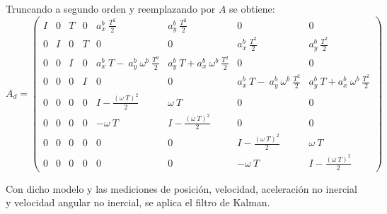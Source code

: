 	Truncando a segundo orden y reemplazando por $A$ se obtiene:
		\begin{equation*}
			A_d = \begin{pmatrix}	I&0&T&0&a^b_x\:\frac{T^2}{2}&a^b_y\:\frac{T^2}{2}&0&0\\[0.3em]%
						0&I&0&T&0&0&a^b_x\:\frac{T^2}{2}&a^b_y\:\frac{T^2}{2}\\[0.3em]%
						0&0&I&0&a^b_x\:T-\:a^b_y\:\omega^b\:\frac{T^2}{2}&a^b_y\: T+a^b_x\:\omega^b\:\frac{T^2}{2}&0&0\\[0.3em]%
						0&0&0&I&0&0&a^b_x\:T-\:a^b_y\:\omega^b\:\frac{T^2}{2}&a^b_y\: T+a^b_x\:\omega^b\:\frac{T^2}{2}\\[0.3em]%
						0&0&0&0&I-\frac{(\omega\:T)^2}{2}&\omega\:T&0&0\\[0.3em]%
						0&0&0&0&-\omega\:T&I-\frac{(\omega\:T)^2}{2}&0&0\\[0.3em]%
						0&0&0&0&0&0&I-\frac{(\omega\:T)^2}{2}&\omega\:T\\[0.3em]%
						0&0&0&0&0&0&-\omega\:T&I-\frac{(\omega\:T)^2}{2}
		\end{pmatrix}
		\end{equation*}


	Con dicho modelo y las mediciones de posición, velocidad, aceleración no inercial y velocidad angular no inercial, se aplica el filtro de Kalman.
	
